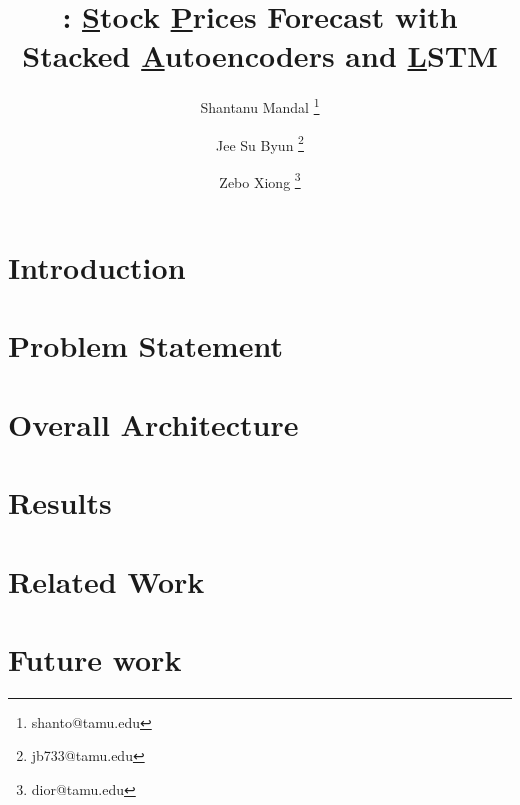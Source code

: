 \documentclass{article}
\title{ \scheme: {\underline S}tock {\underline P}rices Forecast with  Stacked {\underline A}utoencoders and {\underline LSTM} 
}
\author[]{Shantanu Mandal \thanks{shanto@tamu.edu}}
\author[]{Jee Su Byun \thanks{jb733@tamu.edu}}
\author[]{Zebo Xiong \thanks{dior@tamu.edu}}
\affil[]{Texas A\&M University}
\newcommand{\scheme}{SPAL}
\begin{document}
\maketitle


\section{Introduction}
\label{sec-intro}


\section{Problem Statement}
\label{sec-problem}


\section{Overall Architecture}
\label{sec-main}


%

\section{Results}
\label{sec-results}


\section{Related Work}
\label{sec-rel}


\section{Future work}
\label{sec-future}


%


%


%
\end{document}
